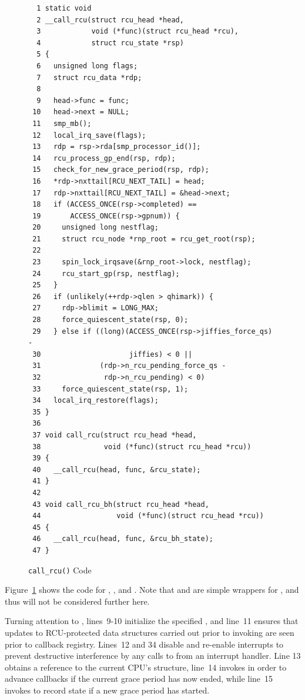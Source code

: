 \begin{figure}[tbp]
{ \scriptsize
\begin{verbatim}
  1 static void
  2 __call_rcu(struct rcu_head *head,
  3            void (*func)(struct rcu_head *rcu),
  4            struct rcu_state *rsp)
  5 {
  6   unsigned long flags;
  7   struct rcu_data *rdp;
  8
  9   head->func = func;
 10   head->next = NULL;
 11   smp_mb();
 12   local_irq_save(flags);
 13   rdp = rsp->rda[smp_processor_id()];
 14   rcu_process_gp_end(rsp, rdp);
 15   check_for_new_grace_period(rsp, rdp);
 16   *rdp->nxttail[RCU_NEXT_TAIL] = head;
 17   rdp->nxttail[RCU_NEXT_TAIL] = &head->next;
 18   if (ACCESS_ONCE(rsp->completed) ==
 19       ACCESS_ONCE(rsp->gpnum)) {
 20     unsigned long nestflag;
 21     struct rcu_node *rnp_root = rcu_get_root(rsp);
 22
 23     spin_lock_irqsave(&rnp_root->lock, nestflag);
 24     rcu_start_gp(rsp, nestflag);
 25   }
 26   if (unlikely(++rdp->qlen > qhimark)) {
 27     rdp->blimit = LONG_MAX;
 28     force_quiescent_state(rsp, 0);
 29   } else if ((long)(ACCESS_ONCE(rsp->jiffies_force_qs) -
 30                     jiffies) < 0 ||
 31              (rdp->n_rcu_pending_force_qs -
 32               rdp->n_rcu_pending) < 0)
 33     force_quiescent_state(rsp, 1);
 34   local_irq_restore(flags);
 35 }
 36
 37 void call_rcu(struct rcu_head *head,
 38               void (*func)(struct rcu_head *rcu))
 39 {
 40   __call_rcu(head, func, &rcu_state);
 41 }
 42
 43 void call_rcu_bh(struct rcu_head *head,
 44                  void (*func)(struct rcu_head *rcu))
 45 {
 46   __call_rcu(head, func, &rcu_bh_state);
 47 }
\end{verbatim}
}
\caption{{\tt call\_rcu()} Code}
\label{fig:app:rcuimpl:rcutreewt:Code for rcutree call-rcu}
\end{figure}

Figure~\ref{fig:app:rcuimpl:rcutreewt:Code for rcutree call-rcu}
shows the code for , , and
.
Note that  and  are simple wrappers
for , and thus will not be considered further here.

Turning attention to , lines~9-10 initialize the
specified , and line~11 ensures that updates to
RCU-protected data structures carried out prior to invoking
 are seen prior to callback registry.
Lines~12 and 34 disable and re-enable interrupts to prevent destructive
interference by any calls to  from an interrupt
handler.
Line 13 obtains a reference to the current CPU's 
structure, line~14 invokes  in order
to advance callbacks if the current grace period has now ended,
while line~15 invokes  to
record state if a new grace period has started.

